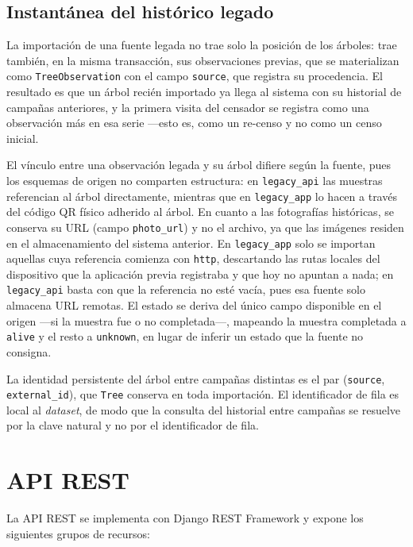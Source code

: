 \subsection{Instantánea del histórico legado}

La importación de una fuente legada no trae solo la posición de los árboles: trae
también, en la misma transacción, sus observaciones previas, que se materializan como
\texttt{TreeObservation} con el campo \texttt{source}, que registra su procedencia. El
resultado es que un árbol recién importado ya llega al sistema con su historial de
campañas anteriores, y la primera visita del censador se registra como una
observación más en esa serie ---esto es, como un re-censo y no como un censo inicial.

El vínculo entre una observación legada y su árbol difiere según la fuente, pues los
esquemas de origen no comparten estructura: en \texttt{legacy\_api} las muestras
referencian al árbol directamente, mientras que en \texttt{legacy\_app} lo hacen a
través del código QR físico adherido al árbol. En cuanto a las fotografías
históricas, se conserva su URL (campo \texttt{photo\_url}) y no el archivo, ya que
las imágenes residen en el almacenamiento del sistema anterior. En \texttt{legacy\_app}
solo se importan aquellas cuya referencia comienza con \texttt{http}, descartando las
rutas locales del dispositivo que la aplicación previa registraba y que hoy no
apuntan a nada; en \texttt{legacy\_api} basta con que la referencia no esté vacía, pues
esa fuente solo almacena URL remotas.
El estado se deriva del único campo disponible en el origen ---si la muestra fue o no
completada---, mapeando la muestra completada a \texttt{alive} y el resto a
\texttt{unknown}, en lugar de inferir un estado que la fuente no consigna.

La identidad persistente del árbol entre campañas distintas es el par
(\texttt{source}, \texttt{external\_id}), que \texttt{Tree} conserva en toda
importación. El identificador de fila es local al \textit{dataset}, de modo que la
consulta del historial entre campañas se resuelve por la clave natural y no por el
identificador de fila.

\section{API REST}
\label{sec:api}

La API REST se implementa con Django REST Framework y expone los siguientes
grupos de recursos:

